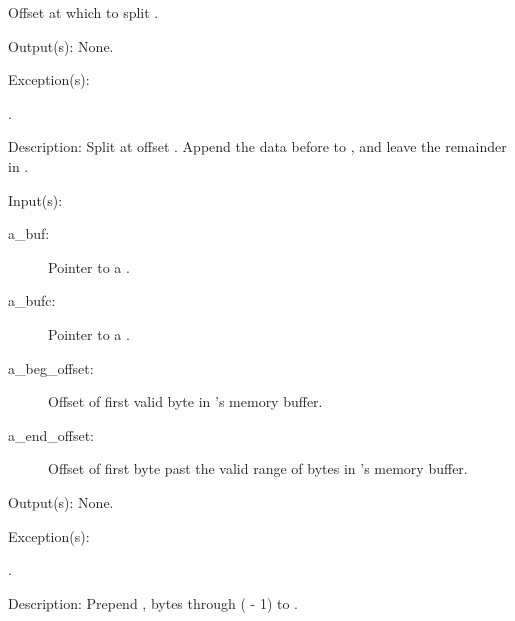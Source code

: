 \begin{capi}
\begin{capilist}
\begin{description}
			Offset at which to split .
		\end{description}
	\item[Output(s): ] None.
	\item[Exception(s): ]
		\begin{description}\item[]
		\item[.]
		\end{description}
	\item[Description: ]
		Split  at offset .  Append the data
		before  to , and leave the remainder
		in .
	\end{capilist}
\label{buf_bufc_prepend}
	\begin{capilist}
	\item[Input(s): ]
		\begin{description}\item[]
		\item[a\_buf: ]
			Pointer to a .
		\item[a\_bufc: ]
			Pointer to a .
		\item[a\_beg\_offset: ]
			Offset of first valid byte in 's memory
			buffer.
		\item[a\_end\_offset: ]
			Offset of first byte past the valid range of bytes in
			's memory buffer.
		\end{description}
	\item[Output(s): ] None.
	\item[Exception(s): ]
		\begin{description}\item[]
		\item[.]
		\end{description}
	\item[Description: ]
		Prepend , bytes  through
		( - 1) to .
	\end{capilist}
\label{buf_bufc_append}
	\begin{capilist}

\end{capilist}
\end{capi}
